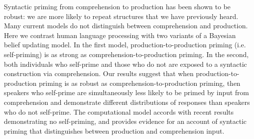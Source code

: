 Syntactic priming from comprehension to production has been shown to be robust: we are more likely to repeat structures that we have previously heard. Many current models do not distinguish between comprehension and production. Here we contrast human language processing with two variants of a Bayesian belief updating model. In the first model, production-to-production priming (i.e. self-priming) is as strong as comprehension-to-production priming. In the second, both individuals who self-prime and those who do not are exposed to a syntactic construction via comprehension. Our results suggest that when production-to-production priming is as robust as comprehension-to-production priming, then speakers who self-prime are simultaneously less likely to be primed by input from comprehension and demonstrate different distributions of responses than speakers who do not self-prime. The computational model accords with recent results demonstrating no self-priming, and provides evidence for an account of syntactic priming that distinguishes between production and comprehension input.
